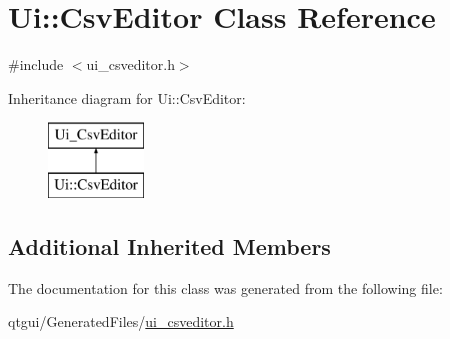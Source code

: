 \hypertarget{class_ui_1_1_csv_editor}{}\section{Ui\+::Csv\+Editor Class Reference}
\label{class_ui_1_1_csv_editor}


{\ttfamily \#include $<$ui\+\_\+csveditor.\+h$>$}

Inheritance diagram for Ui\+::Csv\+Editor\+:\begin{figure}[H]
\begin{center}
\leavevmode
\includegraphics[height=2.000000cm]{d4/df1/class_ui_1_1_csv_editor}
\end{center}
\end{figure}
\subsection*{Additional Inherited Members}


The documentation for this class was generated from the following file\+:\begin{DoxyCompactItemize}
\item 
qtgui/\+Generated\+Files/\mbox{\hyperlink{ui__csveditor_8h}{ui\+\_\+csveditor.\+h}}\end{DoxyCompactItemize}
